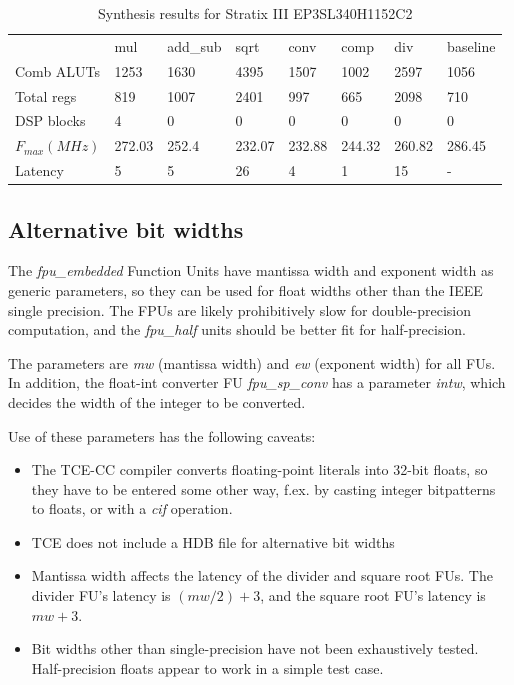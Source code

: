 \documentclass[twoside]{tceusermanual}
\begin{document}
\begin{table}
\begin{center}
\begin{tabular}{|l|l|l|l|l|l|l|l|}\cline{1-8}
 & mul & add\_sub & sqrt & conv & comp & div & baseline \\\cline{1-8}
Comb ALUTs & 1253 & 1630 & 4395 & 1507 & 1002 & 2597 & 1056 \\\cline{1-8}
Total regs & 819 & 1007 & 2401 & 997 & 665 & 2098 & 710 \\\cline{1-8}
DSP blocks & 4 & 0 & 0 & 0 & 0 & 0 & 0 \\\cline{1-8}
$F_{max} (MHz)$ & 272.03 & 252.4 & 232.07 & 232.88 & 244.32 & 260.82 & 286.45 \\\cline{1-8}
Latency & 5 & 5 & 26 & 4 & 1 & 15 & - \\\cline{1-8}
\end{tabular}
\end{center}
\caption{Synthesis results for Stratix III EP3SL340H1152C2}
\label{table:fpu_benchmark2}
\end{table}

\subsection{Alternative bit widths}

The \emph{fpu\_embedded} Function Units have mantissa width and exponent width as generic 
parameters, so they can be used for float widths other than the IEEE single precision. 
The FPUs are likely prohibitively slow for double-precision computation, and the \emph{fpu\_half} units
should be better fit for half-precision.

The parameters are \emph{mw} (mantissa width) and \emph{ew} (exponent width) for all FUs. In addition, the float-int converter FU 
\emph{fpu\_sp\_conv} has a parameter \emph{intw}, which decides the width of the integer to be 
converted.

Use of these parameters has the following caveats:

\begin{itemize}
    \item The TCE-CC compiler converts floating-point literals into 32-bit floats, so they have to be entered some other way, f.ex. by casting integer bitpatterns to floats, or with a \emph{cif} operation.
    \item TCE does not include a HDB file for alternative bit widths
    \item Mantissa width affects the latency of the divider and square root FUs. The divider FU's latency is $(mw/2)+3$, and the square root FU's latency is $mw+3$.
    \item Bit widths other than single-precision have not been exhaustively tested. Half-precision floats appear to work in a simple test case.
\end{itemize}
\end{document}
